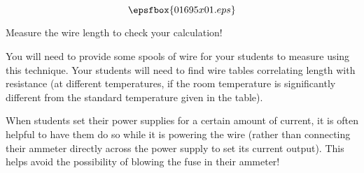 

$$\epsfbox{01695x01.eps}$$

\vfil \eject






Measure the wire length to check your calculation!







You will need to provide some spools of wire for your students to measure using this technique.  Your students will need to find wire tables correlating length with resistance (at different temperatures, if the room temperature is significantly different from the standard temperature given in the table).

\vskip 10pt

When students set their power supplies for a certain amount of current, it is often helpful to have them do so while it is powering the wire (rather than connecting their ammeter directly across the power supply to set its current output).  This helps avoid the possibility of blowing the fuse in their ammeter!




